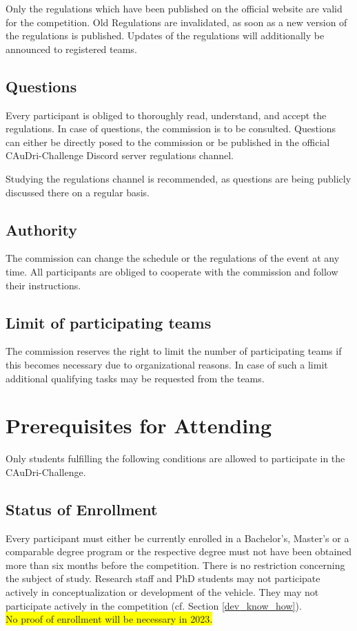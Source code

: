 \documentclass[a4paper]{report}
\begin{document}
Only the regulations which have been published on the official website are valid for the competition. Old Regulations are invalidated, as soon as a new version of the regulations is published. Updates of the regulations will additionally be announced to registered teams. 

\section{Questions}

Every participant is obliged to thoroughly read, understand, and accept the regulations. In case of questions, the commission is to be consulted. Questions can either be directly posed to the commission or be published in the official CAuDri-Challenge Discord server regulations channel. 

Studying the regulations channel is recommended, as questions are being publicly discussed there on a regular basis. 

\section{Authority}

The commission can change the schedule or the regulations of the event at any time. All participants are obliged to cooperate with the commission and follow their instructions. 

\section{Limit of participating teams}

The commission reserves the right to limit the number of participating teams if this becomes necessary due to organizational reasons. In case of such a limit additional qualifying tasks may be requested from the teams. 


\chapter{Prerequisites for Attending}

Only students fulfilling the following conditions are allowed to participate in the CAuDri-Challenge. 

\section{Status of Enrollment}

Every participant must either be currently enrolled in a Bachelor’s, Master’s or a comparable degree program or the respective degree must not have been obtained more than six months before the competition. There is no restriction concerning the subject of study. Research staff and PhD students may not participate actively in conceptualization or development of the vehicle. They may not participate actively in the competition (cf. Section \ref{dev_know_how}).\\
{\colorbox{yellow}{No proof of enrollment will be necessary in 2023.}}
\end{document}
